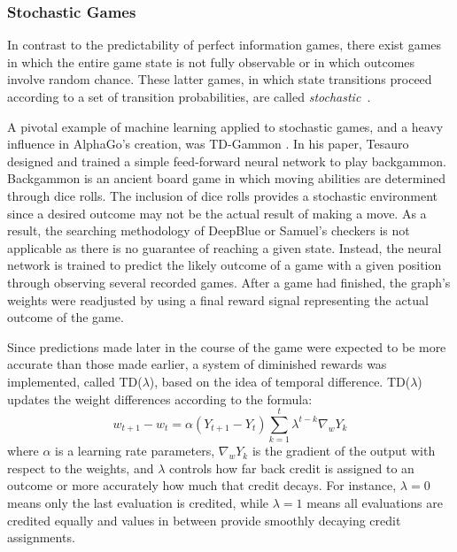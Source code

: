 

\subsubsection*{Stochastic Games}


In contrast to the predictability of perfect information games,
there exist games in which the entire game state is not fully observable
or in which outcomes involve random chance.
%
These latter games,
in which state transitions
proceed according to a set of transition probabilities,
are called \textit{stochastic}~\cite{stochastic_games}.


A pivotal example of machine learning applied to stochastic games,
and a heavy influence in AlphaGo's creation,
was TD-Gammon
\cite{tdgammon}.
%
In his paper,
Tesauro designed and trained a simple feed-forward neural network to play 
backgammon.
%
Backgammon is an ancient board game in which moving abilities are determined
through dice rolls.
%
The inclusion of dice rolls provides a stochastic environment since
a desired outcome may not be the actual result of making a move.
%
As a result,
the searching methodology of DeepBlue or Samuel's checkers is not applicable
as there is no guarantee of reaching a given state.
%
Instead,
the neural network is trained to predict the likely outcome of a game with a
given position
through observing several recorded games.
%
After a game had finished,
the graph's weights were readjusted by using a final reward signal representing
the actual outcome of the game.

Since predictions made later in the course of the game were expected to be more
accurate than those made earlier,
a system of diminished rewards was implemented,
called TD($\lambda$),
based on the idea of temporal difference.
%
TD($\lambda$) updates the weight differences according to the formula:
\[
	w_{t+1} - w_t =
		\alpha (Y_{t+1}-Y_t)
		\sum_{k=1}^t {\lambda^{t-k} \nabla_w Y_k}
\]
where $\alpha$ is a learning rate parameters,
$\nabla_w Y_k$ is the gradient of the output with respect to the weights,
and $\lambda$ controls how far back credit is assigned to an outcome
or more accurately how much that credit decays.
%
For instance,
$\lambda=0$ means only the last evaluation is credited,
while $\lambda=1$ means all evaluations are credited equally
and values in between provide smoothly decaying credit assignments.

